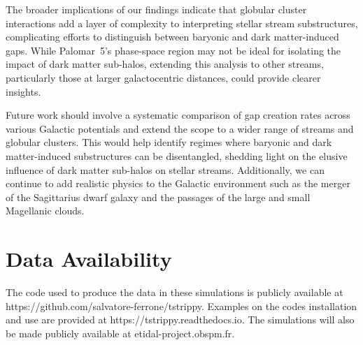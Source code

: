 \documentclass[draft]{aa}
\begin{document}
  The broader implications of our findings indicate that globular cluster interactions add a layer of complexity to interpreting stellar stream substructures, complicating efforts to distinguish between baryonic and dark matter-induced gaps. While Palomar~5's phase-space region may not be ideal for isolating the impact of dark matter sub-halos, extending this analysis to other streams, particularly those at larger galactocentric distances, could provide clearer insights. 

  Future work should involve a systematic comparison of gap creation rates across various Galactic potentials and extend the scope to a wider range of streams and globular clusters. This would help identify regimes where baryonic and dark matter-induced substructures can be disentangled, shedding light on the elusive influence of dark matter sub-halos on stellar streams. Additionally, we can continue to add realistic physics to the Galactic environment such as the merger of the Sagittarius dwarf galaxy and the passages of the large and small Magellanic clouds. 


  
\section*{Data Availability}

  The code used to produce the data in these simulations is publicly available at https://github.com/salvatore-ferrone/tstrippy. Examples on the codes installation and use are provided at https://tstrippy.readthedocs.io. The simulations will also be made publicly available at etidal-project.obspm.fr.







\end{document}
